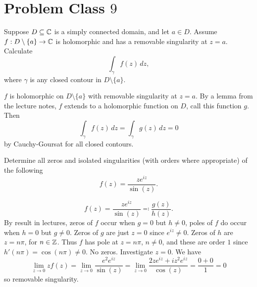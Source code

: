 \documentclass[10pt, a4paper]{article}
\begin{document}
\newpage

\section{Problem Class \texorpdfstring{$9$}{}}

\begin{problem}
    Suppose $D \subseteq \mathbb{C}$ is a simply connected domain,
    and let $a \in D$.
    Assume $f : D \setminus \{a\} \to \mathbb{C}$ is holomorphic and has a removable singularity at $z = a$.
    Calculate
    \[
    \int_{\gamma}f(z)\,dz,
    \]
    where $\gamma$ is any closed contour in $D \setminus \{a\}$.

    \begin{solution}
        $f$ is holomorphic on $D \setminus \{a\}$ with removable singularity at $z = a$.
        By a lemma from the lecture notes,
        $f$ extends to a holomorphic function on $D$,
        call this function $g$.
        Then
        \[
        \int_{\gamma}f(z)\,dz = \int_{\gamma}g(z)\,dz = 0
        \]
        by Cauchy-Goursat for all closed contours.
    \end{solution}
\end{problem}

\begin{problem}
    Determine all zeros and isolated singularities
    (with orders where appropriate)
    of the following
    \[
    f(z) = \frac{ze ^ {iz}}{\sin(z)}.
    \]

    \begin{solution}
        \[
        f(z) = \frac{ze ^ {iz}}{\sin(z)} \eqqcolon \frac{g(z)}{h(z)}.
        \]
        By result in lectures,
        zeros of $f$ occur when $g = 0$ but $h \neq 0$,
        poles of $f$ do occur when $h = 0$ but $g \neq 0$.
        Zeros of $g$ are just $z = 0$ since $e ^ {iz} \neq 0$.
        Zeros of $h$ are $z = n\pi$,
        for $n \in \mathbb{Z}$.
        Thus $f$ has pole at $z = n\pi$,
        $n \neq 0$,
        and these are order $1$ since $h'(n\pi) = \cos(n\pi) \neq 0$.
        No zeros.
        Investigate $z = 0$.
        We have
        \[
        \lim_{z \to 0}zf(z) = \lim_{z \to 0}\frac{e ^ 2e ^ {iz}}{\sin(z)} = \lim_{z \to 0}\frac{2ze ^ {iz} + iz ^ 2e ^ {iz}}{\cos(z)} = \frac{0 + 0}{1} = 0
        \]
        so removable singularity.
    \end{solution}
\end{problem}
\end{document}
